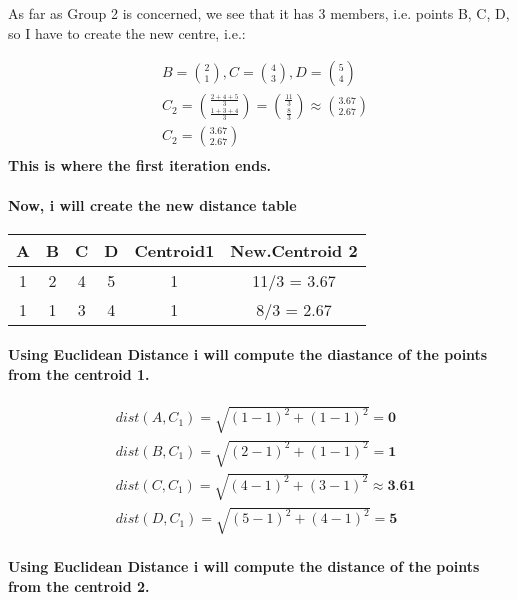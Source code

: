 \documentclass[12pt]{article}
\begin{document}
As far as Group 2 is concerned, we see that it has 3 members, i.e. points B, C, D, so I have to create the new centre, i.e.:

\begin{align*}
    & B = \binom{2}{1}, C = \binom{4}{3}, D = \binom{5}{4}\\
    & C_{2} = \binom{\frac{2+4+5}{3}}{\frac{1 + 3 + 4}{3}}= \binom{\frac{11}{3}}{\frac{8}{3}} \approx \binom{3.67}{2.67}\\
    & C_{2} = \binom{3.67}{2.67}\\
\end{align*}
\textbf{This is where the first iteration ends.}



\paragraph{Now, i will create the new distance table}
\begin{center}
 \begin{tabular}{||c c c c c c||} 
 \hline
 A & B & C & D & Centroid1 & New.Centroid 2\\ [0.5ex] 
 \hline\hline
 1 & 2 & 4 & 5 & 1 & 11/3 = 3.67\\ 
 \hline
 1 & 1 & 3 & 4 & 1 & 8/3 = 2.67\\
 \hline
\end{tabular}
\end{center}

\paragraph{Using Euclidean Distance i will compute the diastance of the points from the centroid 1.}

\begin{align*}
    &dist(A, C_{1}) = \sqrt{(1-1)^2 +(1-1)^2} = \textbf{0}\\
    &dist(B, C_{1}) = \sqrt{(2-1)^2 + (1-1)^2}=\textbf{1}\\
    & dist(C, C_{1}) = \sqrt{(4-1)^2 + (3-1)^2} \approx \textbf{3.61}\\
    & dist(D, C_{1}) = \sqrt{(5-1)^2 + (4-1)^2} = \textbf{5}
\end{align*}


\paragraph{Using Euclidean Distance i will compute the distance of the points from the centroid 2.}
\end{document}
